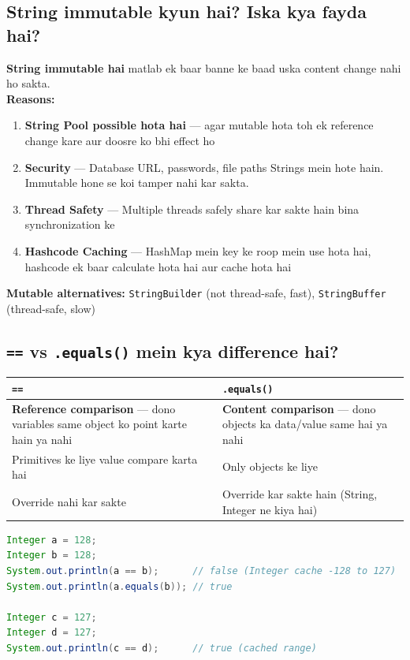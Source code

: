\documentclass[12pt,a4paper]{article}
\begin{document}
\subsection{String immutable kyun hai? Iska kya fayda hai?}

\begin{answerbox}
\textbf{String immutable hai} matlab ek baar banne ke baad uska content change nahi ho sakta.\\[5pt]
\textbf{Reasons:}
\begin{enumerate}
    \item \textbf{String Pool possible hota hai} --- agar mutable hota toh ek reference change kare aur doosre ko bhi effect ho
    \item \textbf{Security} --- Database URL, passwords, file paths Strings mein hote hain. Immutable hone se koi tamper nahi kar sakta.
    \item \textbf{Thread Safety} --- Multiple threads safely share kar sakte hain bina synchronization ke
    \item \textbf{Hashcode Caching} --- HashMap mein key ke roop mein use hota hai, hashcode ek baar calculate hota hai aur cache hota hai
\end{enumerate}
\textbf{Mutable alternatives:} \texttt{StringBuilder} (not thread-safe, fast), \texttt{StringBuffer} (thread-safe, slow)
\end{answerbox}

\subsection{\texttt{==} vs \texttt{.equals()} mein kya difference hai?}

\begin{answerbox}
\begin{center}
\begin{tabular}{p{6cm} p{6cm}}
\toprule
\textbf{\texttt{==}} & \textbf{\texttt{.equals()}} \\
\midrule
\textbf{Reference comparison} --- dono variables same object ko point karte hain ya nahi & \textbf{Content comparison} --- dono objects ka data/value same hai ya nahi \\
Primitives ke liye value compare karta hai & Only objects ke liye \\
Override nahi kar sakte & Override kar sakte hain (String, Integer ne kiya hai) \\
\bottomrule
\end{tabular}
\end{center}
\begin{lstlisting}[language=Java]
Integer a = 128;
Integer b = 128;
System.out.println(a == b);      // false (Integer cache -128 to 127)
System.out.println(a.equals(b)); // true

Integer c = 127;
Integer d = 127;
System.out.println(c == d);      // true (cached range)
\end{lstlisting}
\end{answerbox}
\end{document}

